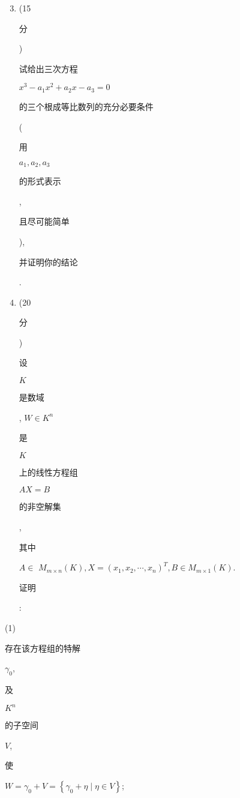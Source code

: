 \documentclass[10pt]{article}
\begin{document}
\begin{enumerate}
  \setcounter{enumi}{2}
  \item (15 \begin{CJK}{UTF8}{mj}分\end{CJK}) \begin{CJK}{UTF8}{mj}试给出三次方程\end{CJK} $x^{3}-a_{1} x^{2}+a_{2} x-a_{3}=0$ \begin{CJK}{UTF8}{mj}的三个根成等比数列的充分必要条件\end{CJK} (\begin{CJK}{UTF8}{mj}用\end{CJK} $a_{1}, a_{2}, a_{3}$ \begin{CJK}{UTF8}{mj}的形式表示\end{CJK}, \begin{CJK}{UTF8}{mj}且尽可能简单\end{CJK}), \begin{CJK}{UTF8}{mj}并证明你的结论\end{CJK}.

  \item (20 \begin{CJK}{UTF8}{mj}分\end{CJK}) \begin{CJK}{UTF8}{mj}设\end{CJK} $K$ \begin{CJK}{UTF8}{mj}是数域\end{CJK}, $W \in K^{n}$ \begin{CJK}{UTF8}{mj}是\end{CJK} $K$ \begin{CJK}{UTF8}{mj}上的线性方程组\end{CJK} $A X=B$ \begin{CJK}{UTF8}{mj}的非空解集\end{CJK}, \begin{CJK}{UTF8}{mj}其中\end{CJK} $A \in$ $M_{m \times n}(K), X=\left(x_{1}, x_{2}, \cdots, x_{n}\right)^{T}, B \in M_{m \times 1}(K)$. \begin{CJK}{UTF8}{mj}证明\end{CJK}:

\end{enumerate}
(1) \begin{CJK}{UTF8}{mj}存在该方程组的特解\end{CJK} $\gamma_{0}$, \begin{CJK}{UTF8}{mj}及\end{CJK} $K^{n}$ \begin{CJK}{UTF8}{mj}的子空间\end{CJK} $V$, \begin{CJK}{UTF8}{mj}使\end{CJK} $W=\gamma_{0}+V=\left\{\gamma_{0}+\eta \mid \eta \in V\right\}$;
\end{document}
